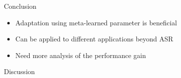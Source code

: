 \documentclass{beamer}
\begin{document}
\begin{frame}[t]{Conclusion}
  \begin{itemize}
    \item Adaptation using meta-learned parameter is beneficial
    \item Can be applied to different applications beyond ASR
    \item Need more analysis of the performance gain
  \end{itemize}
\end{frame}

\begin{frame}
	\begin{center}
    \LARGE{Discussion}
	\end{center}
\end{frame}



\end{document}
